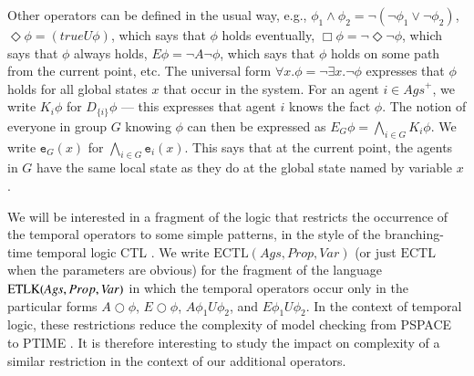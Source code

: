 \documentclass[a4wide]{article}
\newcommand{\ECTL}{\mbox{ECTL}}
\newcommand{\until}{U}
\newcommand{\Prop}{Prop}
\newcommand{\SVar}{V\!ar}
\theoremstyle{examplesty}
\newcommand{\Ags}{\mathit{Ags}}
\newcommand{\Agse}{\mathit{Ags}^+}
\newcommand{\existsg}[1]{\exists #1.}
\newcommand{\forallg}[1]{\forall #1.}
\newcommand{\lid}[2]{\mathtt{e}_{#1}(#2)}
\newcommand{\nxt}{\Circle}
\newcommand{\always}{\Box}
\newcommand{\sometimes}{\Diamond}
\newcommand{\ETL}{{\rm ETLK}}
\begin{document}
Other operators can be defined in the usual way, e.g., $\phi_1\land \phi_2 =  \neg (\neg \phi_1\lor \neg \phi_2)$, $\sometimes\phi = (true\until \phi) $, 
which says that $\phi$ holds eventually, 
 $\always\phi = \neg \sometimes \neg \phi$, 
 which says that $\phi$ always holds, 
$E\phi=\neg A\neg \phi$, which says that $\phi$ holds on some path from the current point, 
 etc. 
The universal form $\forallg{x}\phi = \neg \existsg{x} \neg \phi$ expresses that $\phi$ holds
for all global states  $x$
that occur in the system.  
For an agent 
$i \in \Agse$, 
we  write $K_i \phi$ for $D_{\{i\}} \phi$ ---  
this expresses that  agent $i$ knows the fact $\phi$. 
The notion of everyone in group $G$ knowing $\phi$ can then 
be expressed as $E_G\phi = \bigwedge_{i\in G} K_i \phi$. 
We write  $\lid{G}{x}$ for  $\bigwedge_{i\in G} \lid{i}{x}$. 
This says that at the current point, 
the agents in $G$  have the same local state as they do at 
the global state named by variable $x$. 



We will be interested in a fragment of the logic that restricts the occurrence of the temporal operators
to some simple patterns, in the style of the branching-time temporal logic CTL \cite{CES1986}. 
We write $\ECTL(\Ags,  \Prop,\SVar)$ 
(or just $\ECTL$ when the parameters are obvious)
for 
the fragment of 
the language
$\ETL(\Ags,  \Prop,\SVar)$ in which the temporal operators occur only in the particular forms
$A\nxt \phi$, $E\nxt \phi$, $A\phi_1 \until \phi_2$, and $E \phi_1 \until \phi_2$. 
In the context of temporal logic, these restrictions reduce the complexity of model checking 
from PSPACE to PTIME \cite{CES1986}. It is therefore interesting to study the impact on complexity of a similar restriction in 
the context of our additional operators. 
\end{document}
